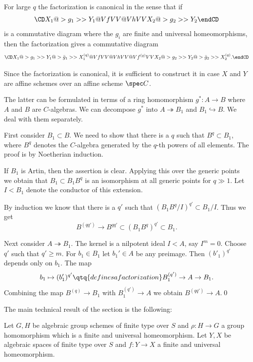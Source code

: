 For large $q$ the factorization is canonical in the sense that if
$$
\CD
X_1@>g_1>> Y_1\\
@VfVV @VhVV\\
X_2@>g_2>> Y_2\\
\endCD
$$
is a commutative diagram where the  $g_i$ are
finite and universal homeomorphisms, then the factorization gives a
commutative diagram
$$
\CD
X_1@>g_1>> Y_1@>\bar g_1>> X_1^{(q)}\\
@VfVV @VhVV @Vf^{(q)}VV \\
X_2@>g_2>> Y_2@>\bar g_2>> X_2^{(q)}.
\endCD
$$
\endproclaim



\demop Since  the factorization is canonical, it is sufficient
to construct it in case $X$ and $Y$ are affine schemes over an affine scheme
$\spec C$.


The latter can be formulated in terms of a ring homomorphism $g^*:A\to B$ where
$A$ and $B$ are $C$-algebras.
We can decompose $g^*$ into $A\twoheadrightarrow B_1$ and $B_1\hookrightarrow
B$. We deal with them separately.


First consider $B_1\subset B$. We need to show that there is a $q$ such that
$B^q\subset B_1$, where $B^q$ denotes the $C$-algebra generated by the $q$-th
powers of all elements. The  proof is by Noetherian induction.

If $B_1$ is Artin, then the assertion is clear. Applying this over the
generic points we obtain that  $B_1\subset B_1B^q$ is an isomorphism at all
generic points for
$q\gg 1$. Let $I<B_1$ denote the conductor of this extension.

By induction we know that there is a $q'$ such that
$(B_1B^q/I)^{q'}\subset B_1/I$. Thus we get
$$
B^{(qq')}\to B^{qq'}\subset (B_1B^q)^{q'}\subset B_1.
$$


Next consider $A\twoheadrightarrow  B_1$.  The kernel
 is a nilpotent ideal $I<A$, say $I^m=0$. Choose $q'$ such that $q'\geq
m$. For $b_1\in B_1$ let $b_1'\in A$ be any preimage. Then
$(b'_1)^{q'}$ depends only on $b_1$. The map
$$
b_1\mapsto (b'_1)^{q'}\qtq{defines a factorization}
B_1^{(q')}\to A\to B_1.
$$
Combining the map  $B^{(q)}\to B_1$ with  $B_1^{(q')}\to A$ we
obtain  $B^{(qq')}\to A$.\qed
\enddemo


The main technical result of the section is the following:

  Let $G,H$ be algebraic group schemes of finite type
over $S$ and $\rho:H\to G$ a group homomorphism which is a finite and universal
homeomorphism. Let $Y,X$ be algebraic spaces of finite type
over $S$ and  $f:Y\to X$ a finite and universal homeomorphism.

